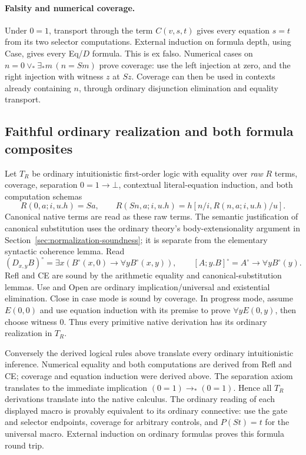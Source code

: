 \paragraph{Falsity and numerical coverage.}
Under $0=1$, transport through the term $C(v,s,t)$ gives every equation
$s=t$ from its two selector computations. External induction on formula
depth, using Case, gives every Eq/$D$ formula. This is ex falso.
Numerical cases on
$n=0\lor_*\exists_*m\,(n=Sm)$ prove coverage: use the left injection
at zero, and the right injection with witness $z$ at $Sz$.
Coverage can then be used in contexts already containing $n$, through
ordinary disjunction elimination and equality transport.

\subsection{Faithful ordinary realization and both formula composites}

Let $T_R$ be ordinary intuitionistic first-order logic with equality over
\emph{raw} $R$ terms, coverage, separation $0=1\to\bot$, contextual
literal-equation induction, and both computation schemas
\[
 R(0,a;i,u.h)=Sa,\qquad
 R(Sn,a;i,u.h)=h[n/i,R(n,a;i,u.h)/u].
\]
Canonical native terms are read as these raw terms. The semantic
justification of canonical substitution uses the ordinary theory's
body-extensionality argument in Section~\ref{sec:normalization-soundness};
it is separate from the elementary syntactic coherence lemma. Read
\[
 (D_{x,y}B)^\circ=\exists x(B^\circ(x,0)\to\forall yB^\circ(x,y)),
 \qquad [A;y.B]^\circ=A^\circ\to\forall yB^\circ(y).
\]
Refl and CE are sound by the arithmetic equality and canonical-substitution
lemmas. Use and Open are ordinary implication/universal and existential
elimination. Close in case mode is sound by coverage. In progress mode,
assume $E(0,0)$ and use equation induction with its premise to prove
$\forall yE(0,y)$, then choose witness $0$. Thus every primitive native
derivation has its ordinary realization in $T_R$.

Conversely the derived logical rules above translate every ordinary
intuitionistic inference. Numerical equality and both computations are
derived from Refl and CE; coverage and equation induction were derived
above. The separation axiom translates to the immediate implication
$(0=1)\to_*(0=1)$. Hence all $T_R$ derivations translate into the native
calculus. The ordinary reading of each displayed macro is provably
equivalent to its ordinary connective: use the gate and selector endpoints,
coverage for arbitrary controls, and $P(St)=t$ for the universal macro.
External induction on ordinary formulas proves this formula round trip.


